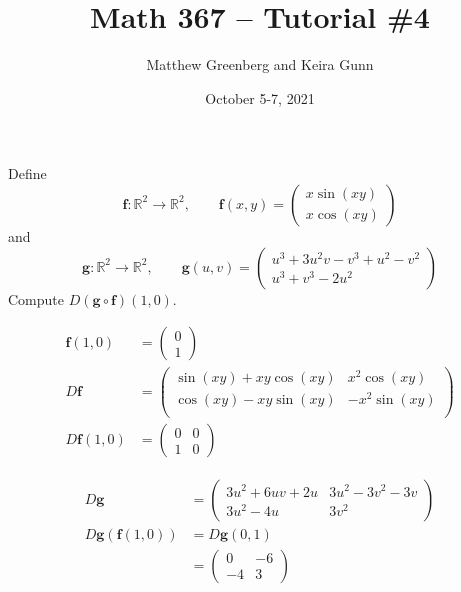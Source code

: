 \documentclass{exam}
\newcommand{\RR}{\mathbb{R}}
\newcommand{\vf}{\mathbf{f}}
\newcommand{\vg}{\mathbf{g}}
\begin{document}
\title{Math 367 -- Tutorial \#4}
\author{Matthew Greenberg and Keira Gunn}
\date{October 5-7, 2021}
\maketitle

\begin{questions}
    \setlength\itemsep{1em}
    \question Define
    \[
        \vf:\RR^2\to\RR^2,\qquad \vf(x,y)=\begin{pmatrix}
            x\sin(xy)\\x\cos(xy)
        \end{pmatrix}
    \]
    and
    \[
        \vg:\RR^2\to\RR^2,\qquad \vg(u,v)=\begin{pmatrix}
            u^3 + 3u^2v - v^3 + u^2 - v^2\\
            u^3 + v^3 - 2u^2
        \end{pmatrix}
    \]
    Compute $D(\vg\circ\vf)(1,0)$.

    \begin{solution}
        \begin{align*}
            \vf(1,0) &=\begin{pmatrix}
                0\\1
            \end{pmatrix}\\
            D\vf &= \begin{pmatrix}
                \sin(xy) + xy\cos(xy) & x^2\cos(xy)\\
                \cos(xy) - xy\sin(xy) & -x^2\sin(xy)\\
            \end{pmatrix}\\
            D\vf(1,0) &= \begin{pmatrix}
                0&0\\1&0
            \end{pmatrix}
        \end{align*}

        \begin{align*}
            D\vg &= \begin{pmatrix}
                3u^2 + 6uv + 2u&3u^2-3v^2-3v\\
                3u^2 - 4u&3v^2
            \end{pmatrix}\\
            D\vg(\vf(1,0)) &= D\vg(0,1)\\
            &=\begin{pmatrix}
                0&-6\\-4&3
            \end{pmatrix}
        \end{align*}


\end{solution}
\end{questions}
\end{document}
